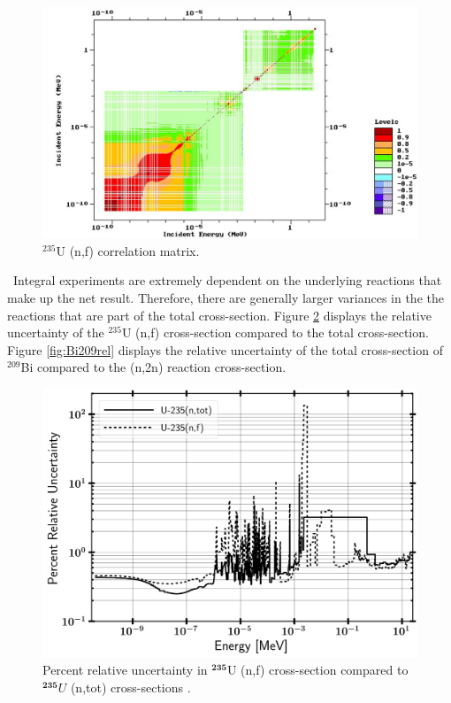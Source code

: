 \begin{figure}[htb!]
	\includegraphics[width=\linewidth]{Figures/Chapter2/U235_nf_coor.png}
	\caption[$\mathrm{^{235}}$U (n,f) correlation matrix.]{$\mathrm{^{235}}$U (n,f) correlation matrix\cite{ENDF}.}
	\label{fig:coor}
\end{figure}

\ Integral experiments are extremely dependent on the underlying reactions that make up the net result. 
Therefore, there are generally larger variances in the the reactions that are part of the total cross-section. 
Figure \ref{fig:U235rel} displays the relative uncertainty of the $\mathrm{^{235}}$U (n,f) cross-section compared to the total cross-section. 
Figure \ref{fig:Bi209rel} displays the relative uncertainty of the total cross-section of $\mathrm{^{209}}$Bi compared to the (n,2n) reaction cross-section. 

\begin{figure}[htb!]
	\includegraphics[width=0.9\linewidth]{Figures/Chapter2/U235_RelUncert.png}
	\caption[Percent relative uncertainty in $\mathrm{^{235}}$U (n,f) cross-section compared to $\mathrm{^{235}}$U (n,tot) cross-section]{Percent relative uncertainty in $\mathbf{^{235}}$U (n,f) cross-section compared to $\mathbf{^{235}}U$ (n,tot) cross-sections \cite{ENDF}.}
	\label{fig:U235rel}
\end{figure}

